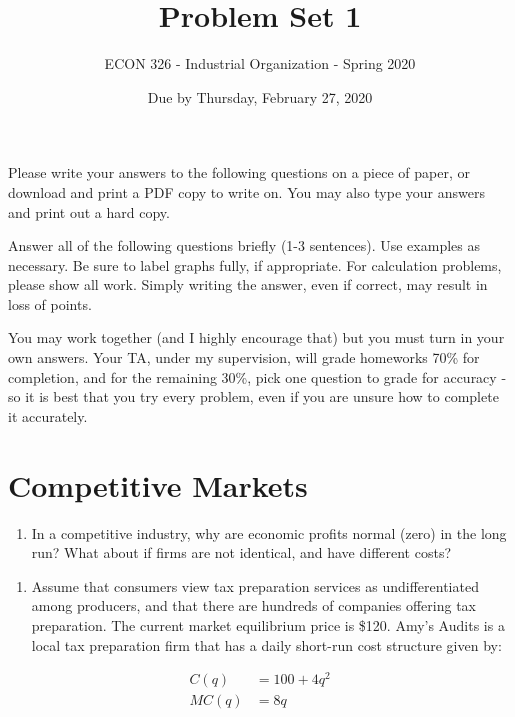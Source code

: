 \documentclass[]{article}
\title{Problem Set 1}
\author{ECON 326 - Industrial Organization - Spring 2020}
\date{Due by Thursday, February 27, 2020}
\providecommand{\tightlist}{%
  \setlength{\itemsep}{0pt}\setlength{\parskip}{0pt}}
\begin{document}
\maketitle

Please write your answers to the following questions on a piece of
paper, or download and print a PDF copy to write on. You may also type
your answers and print out a hard copy.

Answer all of the following questions briefly (1-3 sentences). Use
examples as necessary. Be sure to label graphs fully, if appropriate.
For calculation problems, please show all work. Simply writing the
answer, even if correct, may result in loss of points.

You may work together (and I highly encourage that) but you must turn in
your own answers. Your TA, under my supervision, will grade homeworks
70\% for completion, and for the remaining 30\%, pick one question to
grade for accuracy - so it is best that you try every problem, even if
you are unsure how to complete it accurately.

\hypertarget{competitive-markets}{%
\section{Competitive Markets}\label{competitive-markets}}

\begin{enumerate}
\def\labelenumi{\arabic{enumi}.}
\tightlist
\item
  In a competitive industry, why are economic profits normal (zero) in
  the long run? What about if firms are not identical, and have
  different costs?
\end{enumerate}

\clearpage

\begin{enumerate}
\def\labelenumi{\arabic{enumi}.}
\setcounter{enumi}{1}
\tightlist
\item
  Assume that consumers view tax preparation services as
  undifferentiated among producers, and that there are hundreds of
  companies offering tax preparation. The current market equilibrium
  price is \$120. Amy's Audits is a local tax preparation firm that has
  a daily short-run cost structure given by:
\end{enumerate}

\[\begin{aligned}
C(q)&=100+4q^2\\
MC(q)&=8q\\
\end{aligned}\]
\end{document}
